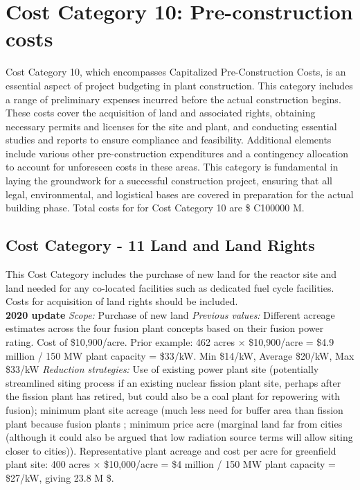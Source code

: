 \section{Cost Category 10: Pre-construction costs}

Cost Category 10, which encompasses Capitalized Pre-Construction Costs, is an essential aspect of project budgeting in plant construction. This category includes a range of preliminary expenses incurred before the actual construction begins. These costs cover the acquisition of land and associated rights, obtaining necessary permits and licenses for the site and plant, and conducting essential studies and reports to ensure compliance and feasibility. Additional elements include various other pre-construction expenditures and a contingency allocation to account for unforeseen costs in these areas. This category is fundamental in laying the groundwork for a successful construction project, ensuring that all legal, environmental, and logistical bases are covered in preparation for the actual building phase.  Total costs for for Cost Category 10 are \$ C100000 M.

\subsection*{Cost Category - 11 Land and Land Rights}
This Cost Category includes the purchase of new land for the reactor site and land needed for any co-located facilities such as dedicated fuel cycle facilities.  Costs for acquisition of land rights should be included. \\

 \textbf{2020 update} 
\emph{Scope: }Purchase of new land 
 \emph{Previous values: } 
Different acreage estimates across the four fusion plant concepts based on their fusion power rating. Cost of \$10,900/acre. 
Prior example: 462 acres $\times$ \$10,900/acre = \$4.9 million / 150 MW plant capacity =  \$33/kW.  Min \$14/kW, Average \$20/kW, Max \$33/kW  
 \emph{Reduction strategies: } 
 Use of existing power plant site (potentially streamlined siting process if an existing nuclear fission plant site, perhaps after the fission plant has retired, but could also be a coal plant for repowering with fusion); minimum plant site acreage (much less need for buffer area than fission plant because fusion plants ; minimum price acre (marginal land far from cities (although it could also be argued that low radiation source terms will allow siting closer to cities)). 
Representative plant acreage and cost per acre for greenfield plant site: 400 acres $\times$ \$10,000/acre = \$4 million / 150 MW plant capacity = \$27/kW, giving 23.8 M \$.  \\


